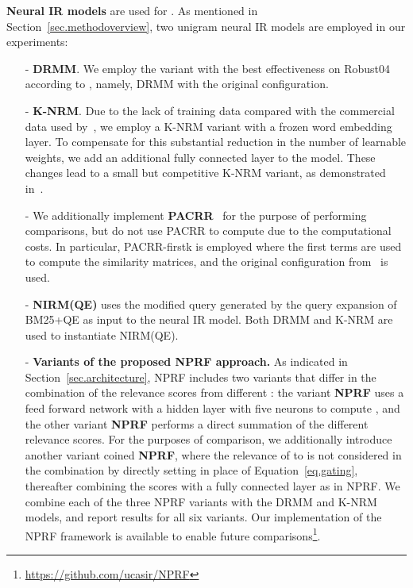 \documentclass[11pt,a4paper]{article}
\begin{document}
\noindent\textbf{Neural IR models} are used for . As mentioned in Section~\ref{sec.methodoverview},
two unigram neural IR models are employed in our experiments:

\begin{itemize}[leftmargin=*]

\item[-] 
\noindent \textbf{DRMM}. We employ the variant with the best effectiveness on Robust04
according to \cite{DBLP:conf/cikm/GuoFAC16}, namely, 
DRMM with the original configuration.

\item[-] 
\noindent \textbf{K-NRM}.
Due to the lack of training data compared with the commercial data used by~\cite{DBLP:conf/sigir/XiongDCLP17}, we employ a K-NRM variant with a frozen word embedding layer.
To compensate for this substantial reduction in the number of learnable weights,
we add an additional fully connected layer to the model.
These changes lead to a small but competitive K-NRM variant, as demonstrated in~\cite{DBLP:conf/wsdm/HuiYBM18}.

\item[-]
\noindent We additionally implement \textbf{PACRR}~\cite{DBLP:conf/emnlp/HuiYBM17}
for the purpose of performing comparisons, but do not use PACRR to compute
 due to the computational costs.
In particular, PACRR-firstk is employed where the first  terms
are used to compute the similarity matrices, and the original configuration from~\cite{DBLP:conf/emnlp/HuiYBM17} is used.

\item[-] 
\noindent \textbf{NIRM(QE)} uses the modified query generated by the query expansion of BM25+QE \cite{DBLP:conf/trec/YeHHYL09} 
as input to the neural IR model. Both DRMM and K-NRM are used to instantiate NIRM(QE).



\item[-]
\noindent \textbf{Variants of the proposed NPRF approach.}
As indicated in Section~\ref{sec.architecture},
NPRF includes two variants that differ in the combination of the relevance scores from different :
the variant {\bf NPRF} 
uses a feed forward network with a hidden layer with five neurons to compute ,
and the other variant {\bf NPRF} performs a direct summation of the different relevance scores.
For the purposes of comparison, we additionally
introduce another variant coined {\bf NPRF}, where 
the relevance of  to  is not considered in the combination by 
directly setting  in place of
Equation~\ref{eq.gating}, 
thereafter combining the scores with a fully connected layer as in  NPRF.
We combine each of the three NPRF variants with the DRMM and K-NRM models,
and report results for all six variants.
Our implementation of the NPRF framework is available to enable future comparisons\footnote{\url{https://github.com/ucasir/NPRF}}.

\end{itemize}
\end{document}
